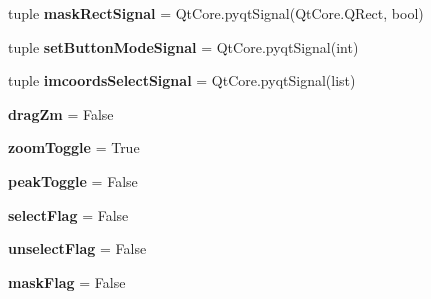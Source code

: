 \begin{DoxyCompactItemize}
\item 
\hypertarget{classmyImDisplay_1_1myImDisplay_aebd7f068977c74a612f0428fe26bf86c}{tuple {\bfseries mask\-Rect\-Signal} = Qt\-Core.\-pyqt\-Signal(Qt\-Core.\-Q\-Rect, bool)}\label{classmyImDisplay_1_1myImDisplay_aebd7f068977c74a612f0428fe26bf86c}

\item 
\hypertarget{classmyImDisplay_1_1myImDisplay_a4c70f21c598d0b670373d09133d09767}{tuple {\bfseries set\-Button\-Mode\-Signal} = Qt\-Core.\-pyqt\-Signal(int)}\label{classmyImDisplay_1_1myImDisplay_a4c70f21c598d0b670373d09133d09767}

\item 
\hypertarget{classmyImDisplay_1_1myImDisplay_a1f5a4286181533164cb3ab70ee622264}{tuple {\bfseries imcoords\-Select\-Signal} = Qt\-Core.\-pyqt\-Signal(list)}\label{classmyImDisplay_1_1myImDisplay_a1f5a4286181533164cb3ab70ee622264}

\item 
\hypertarget{classmyImDisplay_1_1myImDisplay_aed334f8955978445c19ec065984ffdf1}{{\bfseries drag\-Zm} = False}\label{classmyImDisplay_1_1myImDisplay_aed334f8955978445c19ec065984ffdf1}

\item 
\hypertarget{classmyImDisplay_1_1myImDisplay_a1ede5c771d24ccc9bc28d13b9af5aea9}{{\bfseries zoom\-Toggle} = True}\label{classmyImDisplay_1_1myImDisplay_a1ede5c771d24ccc9bc28d13b9af5aea9}

\item 
\hypertarget{classmyImDisplay_1_1myImDisplay_a14cb30b4564e4b042b23f20adbf38c72}{{\bfseries peak\-Toggle} = False}\label{classmyImDisplay_1_1myImDisplay_a14cb30b4564e4b042b23f20adbf38c72}

\item 
\hypertarget{classmyImDisplay_1_1myImDisplay_a233a9c327101136d4cf81d5e47f22f08}{{\bfseries select\-Flag} = False}\label{classmyImDisplay_1_1myImDisplay_a233a9c327101136d4cf81d5e47f22f08}

\item 
\hypertarget{classmyImDisplay_1_1myImDisplay_a31a7d969ae2427fdc98ac41f7097ba5a}{{\bfseries unselect\-Flag} = False}\label{classmyImDisplay_1_1myImDisplay_a31a7d969ae2427fdc98ac41f7097ba5a}

\item 
\hypertarget{classmyImDisplay_1_1myImDisplay_a1afbe7e34027cf61cd59d25b90de33e4}{{\bfseries mask\-Flag} = False}\label{classmyImDisplay_1_1myImDisplay_a1afbe7e34027cf61cd59d25b90de33e4}


\end{DoxyCompactItemize}
